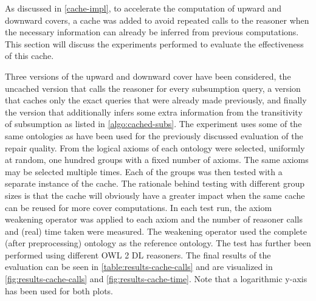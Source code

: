 
As discussed in \cref{cache-impl}, to accelerate the computation of upward and downward covers, a cache was added to avoid repeated calls to the reasoner when the necessary information can already be inferred from previous computations. This section will discuss the experiments performed to evaluate the effectiveness of this cache.

Three versions of the upward and downward cover have been considered, the uncached version that calls the reasoner for every subsumption query, a version that caches only the exact queries that were already made previously, and finally the version that additionally infers some extra information from the transitivity of subsumption as listed in \cref{algo:cached-subs}. The experiment uses some of the same ontologies as have been used for the previously discussed evaluation of the repair quality. From the logical axioms of each ontology were selected, uniformly at random, one hundred groups with a fixed number of axioms. The same axioms may be selected multiple times. Each of the groups was then tested with a separate instance of the cache. The rationale behind testing with different group sizes is that the cache will obviously have a greater impact when the same cache can be reused for more cover computations. In each test run, the axiom weakening operator was applied to each axiom and the number of reasoner calls and (real) time taken were measured. The weakening operator used the complete (after preprocessing) ontology as the reference ontology. The test has further been performed using different OWL 2 DL reasoners. The final results of the evaluation can be seen in \cref{table:results-cache-calls} and are visualized in \cref{fig:results-cache-calls} and \cref{fig:results-cache-time}. Note that a logarithmic y-axis has been used for both plots.

